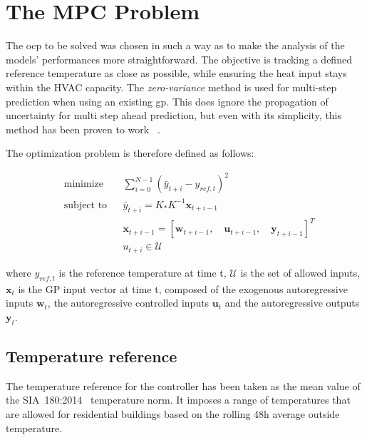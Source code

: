 \section{The MPC Problem}\label{sec:mpc_problem}

The \acrlong{ocp} to be solved was chosen in such a way as to make the
analysis of the models' performances more straightforward. The objective is
tracking a defined reference temperature as close as possible, while ensuring
the heat input stays within the HVAC capacity. The \textit{zero-variance} method
is used for multi-step prediction when using an existing \acrshort{gp}. This
does ignore the propagation of uncertainty for multi step ahead prediction, but
even with its simplicity, this method has been proven to work
~\cite{kocijanModellingControlDynamic2016,jainLearningControlUsing2018,
pleweSupervisoryModelPredictive2020}.

The optimization problem is therefore defined as follows:

\begin{subequations}\label{eq:optimal_control_problem}
    \begin{align}
        & \text{minimize}
        & & \sum_{i=0}^{N-1} (\bar{y}_{t+i} - y_{ref, t})^2 \\
        & \text{subject to}
        & & \bar{y}_{t+i} = K_*K^{-1}\mathbf{x}_{t+i-1} \\
        &&& \mathbf{x}_{t+i-1} = \left[\mathbf{w}_{t+i-1},\quad
        \mathbf{u}_{t+i-1},\quad \mathbf{y}_{t+i-1}\right]^T \\
        \label{eq:components}
        &&& u_{t+i} \in \mathcal{U}
    \end{align}
\end{subequations}

where $y_{ref, t}$ is the reference temperature at time t, $\mathcal{U}$ is the
set of allowed inputs, $\mathbf{x}_{t}$ is the GP input vector at time t,
composed of the exogenous autoregressive inputs $\mathbf{w}_{t}$, the
autoregressive controlled inputs $\mathbf{u}_{t}$ and the autoregressive outputs
$\mathbf{y}_{t}$.

\subsection{Temperature reference}\label{sec:reference_temperature}

The temperature reference for the controller has been taken as the mean value of
the SIA~180:2014~\cite{sia180:2014ProtectionThermiqueProtection2014} temperature
norm. It imposes a range of temperatures that are allowed for residential
buildings based on the rolling 48h average outside temperature.


